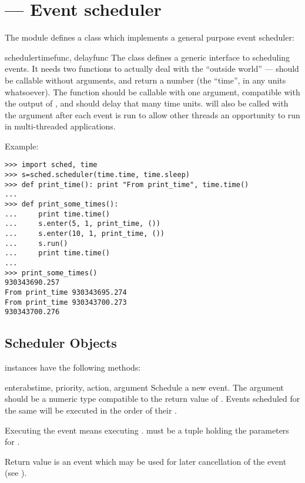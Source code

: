 \section{ ---
         Event scheduler}



The  module defines a class which implements a general
purpose event scheduler:

\begin{classdesc}{scheduler}{timefunc, delayfunc}
The  class defines a generic interface to scheduling
events. It needs two functions to actually deal with the ``outside world''
---  should be callable without arguments, and return 
a number (the ``time'', in any units whatsoever).  The 
function should be callable with one argument, compatible with the output
of , and should delay that many time units.
 will also be called with the argument  after
each event is run to allow other threads an opportunity to run in
multi-threaded applications.
\end{classdesc}

Example:

\begin{verbatim}
>>> import sched, time
>>> s=sched.scheduler(time.time, time.sleep)
>>> def print_time(): print "From print_time", time.time()
...
>>> def print_some_times():
...     print time.time()
...     s.enter(5, 1, print_time, ())
...     s.enter(10, 1, print_time, ())
...     s.run()
...     print time.time()
...
>>> print_some_times()
930343690.257
From print_time 930343695.274
From print_time 930343700.273
930343700.276
\end{verbatim}


\subsection{Scheduler Objects \label{scheduler-objects}}

 instances have the following methods:

\begin{methoddesc}{enterabs}{time, priority, action, argument}
Schedule a new event. The  argument should be a numeric type
compatible to the return value of . Events scheduled for
the same  will be executed in the order of their
.

Executing the event means executing .   must be a tuple holding the
parameters for .

Return value is an event which may be used for later cancellation of
the event (see ).
\end{methoddesc}

